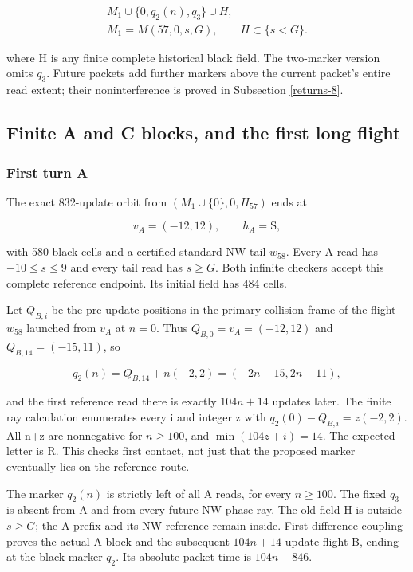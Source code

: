 \begin{equation}\label{eq:rt22}
\begin{gathered}M_1\cup\{0,q_2(n),q_3\}\cup H,\\M_1=M(57,0,s,G),\qquad H\subset\{s<G\}.\end{gathered}
\end{equation}

where H is any finite complete historical black field. The two-marker
version omits $q_3$. Future packets add further markers above the current
packet's entire read extent; their noninterference is proved in
Subsection \ref{returns-8}.

\subsection{Finite A and C blocks, and the first long
flight}\label{returns-3}

\subsubsection{First turn A}\label{first-turn-a}

The exact 832-update orbit from $(M_1\cup\{0\},0,H_{57})$ ends at

\[
v_A=(-12,12),\qquad h_A=\mathrm S,
\]

with 580 black cells and a certified standard NW tail $w_{58}$. Every A
read has $-10\le s\le9$ and every tail read has
$s\ge G$. Both infinite checkers accept this complete reference
endpoint. Its initial field has 484 cells.

Let $Q_{B,i}$ be the pre-update positions in the primary collision frame of
the flight $w_{58}$ launched from $v_A$ at $n=0$. Thus $Q_{B,0}=v_A=(-12,12)$
and $Q_{B,14}=(-15,11)$, so

\[
q_2(n)=Q_{B,14}+n(-2,2)=(-2n-15,2n+11),
\]

and the first reference read there is exactly $104n+14$ updates later. The
finite ray calculation enumerates every i and integer z with
$q_2(0)-Q_{B,i}=z(-2,2)$. All n+z are nonnegative for $n\ge100$,
and $\min(104z+i)=14$. The expected letter is R. This checks first contact,
not just that the proposed marker eventually lies on the reference
route.

The marker $q_2(n)$ is strictly left of all A reads, for every
$n\ge100$. The fixed $q_3$ is absent from A and from every future
NW phase ray. The old field H is outside $s\ge G$; the A prefix
and its NW reference remain inside. First-difference coupling proves the
actual A block and the subsequent $104n+14$-update flight B, ending at the
black marker $q_2$. Its absolute packet time is $104n+846$.

